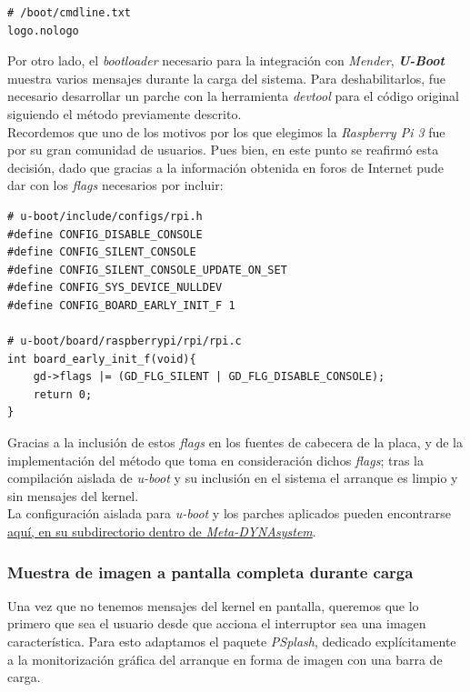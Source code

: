 \begin{lstlisting}
# /boot/cmdline.txt
logo.nologo
\end{lstlisting}

Por otro lado, el \textit{bootloader} necesario para la integración con \textit{Mender}, \textbf{\textit{U-Boot}} muestra varios mensajes durante la carga del sistema. Para deshabilitarlos, fue necesario desarrollar un parche con la herramienta \textit{devtool} para el código original siguiendo el método previamente descrito.\\

Recordemos que uno de los motivos por los que elegimos la \textit{Raspberry Pi 3} fue por su gran comunidad de usuarios. Pues bien, en este punto se reafirmó esta decisión, dado que gracias a la información obtenida en foros de Internet pude dar con los \textit{flags} necesarios por incluir:

\begin{lstlisting}
# u-boot/include/configs/rpi.h
#define CONFIG_DISABLE_CONSOLE
#define CONFIG_SILENT_CONSOLE
#define CONFIG_SILENT_CONSOLE_UPDATE_ON_SET
#define CONFIG_SYS_DEVICE_NULLDEV
#define CONFIG_BOARD_EARLY_INIT_F 1

# u-boot/board/raspberrypi/rpi/rpi.c
int board_early_init_f(void){
	gd->flags |= (GD_FLG_SILENT | GD_FLG_DISABLE_CONSOLE);
	return 0;
}
\end{lstlisting}

Gracias a la inclusión de estos \textit{flags} en los fuentes de cabecera de la placa, y de la implementación del método que toma en consideración dichos \textit{flags}; tras la compilación aislada de \textit{u-boot} y su inclusión en el sistema el arranque es limpio y sin mensajes del kernel.\\

La configuración aislada para \textit{u-boot} y los parches aplicados pueden encontrarse \href{https://github.com/adrianmorente/meta-dynasystem/tree/master/recipes-bsp/u-boot}{aquí, en su subdirectorio dentro de \textit{Meta-DYNAsystem}}.

\subsubsection{Muestra de imagen a pantalla completa durante carga}

Una vez que no tenemos mensajes del kernel en pantalla, queremos que lo primero que sea el usuario desde que acciona el interruptor sea una imagen característica. Para esto adaptamos el paquete \textit{PSplash}, dedicado explícitamente a la monitorización gráfica del arranque en forma de imagen con una barra de carga.\\

